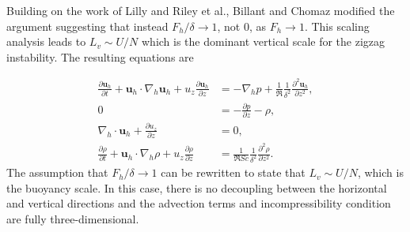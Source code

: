 Building on the work of Lilly \cite{lilly1983} and Riley et al.\cite{rileylelong2000}, Billant and Chomaz \cite{bc2001} modified the argument suggesting that instead $F_{h}/\delta\rightarrow 1$, not $0$, as $F_{h}\rightarrow 1$. This scaling analysis leads to $L_{v} \sim U/N$ which is the dominant vertical scale for the zigzag instability. The resulting equations are

\begin{align}
\frac{\partial \textbf{u}_{h}}{\partial t} + \textbf{u}_{h}\cdot\nabla_{h}\textbf{u}_{h}+u_{z}\frac{\partial \textbf{u}_{h}}{\partial z} &= -\nabla_{h}p + \frac{1}{\Re}\frac{1}{\delta^{2}}\frac{\partial^{2}\textbf{u}_{h}}{\partial z^{2}},\\
0&= -\frac{\partial p}{\partial z} - \rho, \\
\nabla_{h}\cdot\textbf{u}_{h}+ \frac{\partial u_{z}}{\partial z} &=0,\\
\frac{\partial \rho}{\partial t} + \textbf{u}_{h}\cdot\nabla_{h}\rho + u_{z}\frac{\partial \rho}{\partial z} &=  \frac{1}{\Re Sc}\frac{1}{\delta^{2}}\frac{\partial^{2}\rho}{\partial z^{2}}. 
\end{align} 
The assumption that $F_{h}/\delta \rightarrow 1$ can be rewritten to state that $L_{v} \sim U/N$, which is the buoyancy scale. In this case, there is no decoupling between the horizontal and vertical directions and the advection terms and incompressibility condition are fully three-dimensional. 

%
%

